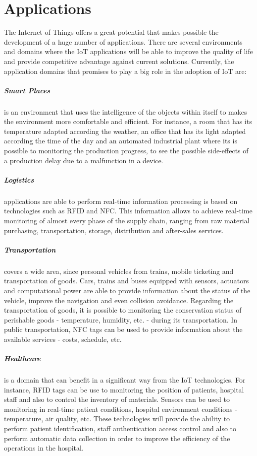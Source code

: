 \section{Applications}
\label{sec:applications}
The Internet of Things offers a great potential that makes possible the development of a huge number
of applications. There are several environments and domains where the \gls{IoT} applications will be
able to improve the quality of life and provide competitive advantage against current solutions.
Currently, the application domains that promises to play a big role in the adoption of \gls{IoT} are:
\subparagraph{Smart Places} is an environment that uses the intelligence of the objects within itself
to makes the environment more comfortable and efficient. For instance, a room that has its
temperature adapted according the weather, an office that has its light adapted according the time of
the day and an automated industrial plant where its is possible to monitoring the production progress,
to see the possible side-effects of a production delay due to a malfunction in a device.
\subparagraph{Logistics} applications are able to perform real-time information processing is based
on technologies such as \gls{RFID} and NFC. This information allows to achieve real-time monitoring
of almost every phase of the supply chain, ranging from raw material purchasing, transportation,
storage, distribution and after-sales services.
\subparagraph{Transportation} covers a wide area, since personal vehicles from trains, mobile ticketing
and transportation of goods. Cars, trains and buses equipped with sensors, actuators and computational
power are able to provide information about the status of the vehicle, improve the navigation and even
collision avoidance. Regarding the transportation of goods, it is possible to monitoring the conservation
status of perishable goods - temperature, humidity, etc. -  during its transportation. In public
transportation, NFC tags can be used to provide information about the available services - costs,
schedule, etc.
\subparagraph{Healthcare} is a domain that can benefit in a significant way from the \gls{IoT}
technologies. For instance, \gls{RFID} tags can be use to monitoring the position of patients,
hospital staff and also to control the inventory of materials. Sensors can be used to monitoring
in real-time patient conditions, hospital environment conditions - temperature, air quality, etc.
These technologies will provide the ability to perform patient identification, staff authentication
access control and also to perform automatic data collection in order to improve the efficiency of
the operations in the hospital.
